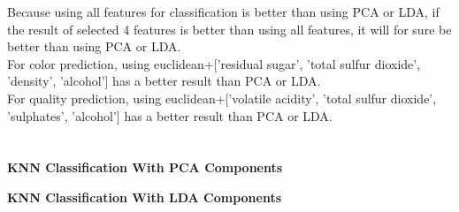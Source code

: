 \documentclass[12pt]{article}
\begin{document}
\noindent
Because using all features for classification is better than using PCA or LDA, if the result of selected 4 features is better than using all features, it will for sure be better than using PCA or LDA.\\ For color prediction, using euclidean+['residual sugar', 'total sulfur dioxide', 'density', 'alcohol'] has a better result than PCA or LDA.\\
For quality prediction, using euclidean+['volatile acidity', 'total sulfur dioxide', 'sulphates', 'alcohol'] has a better result than PCA or LDA.\\\\\\
\textbf{KNN Classification With PCA Components}
\begin{figure}[H]
\captionsetup[subfigure]{labelformat=empty}
\centering
{}
\end{figure}
\noindent
\textbf{KNN Classification With LDA Components}
\begin{figure}[H]
\captionsetup[subfigure]{labelformat=empty}
\centering
{}
\end{figure}
\end{document}
